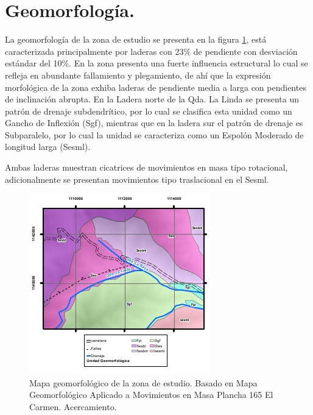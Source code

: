 \section{Geomorfolog\'{i}a.}
La geomorfolog\'{i}a de la zona de estudio se presenta en la figura \ref{fig:mapageomorfo}, est\'{a} caracterizada principalmente por laderas con 23\% de pendiente con desviaci\'{o}n est\'{a}ndar del 10\%.
En la zona presenta una fuerte influencia estructural lo cual se refleja en abundante fallamiento y plegamiento, de ah\'i que la expresi\'{o}n morfol\'{o}gica de la zona exhiba laderas de pendiente media a larga con pendientes de inclinaci\'{o}n abrupta. En la Ladera norte de la Qda. La Linda se presenta un patr\'{o}n de drenaje subdendr\'{i}tico, por lo cual se clasifica esta unidad como un Gancho de Inflexi\'{o}n (Sgf), mientras que en la ladera sur el patr\'{o}n de drenaje es Subparalelo, por lo cual la unidad se caracteriza como un Espol\'{o}n Moderado de longitud larga (Sesml). \cite{urrao}\par
Ambas laderas muestran cicatrices de movimientos en masa tipo rotacional, adicionalmente se presentan movimientos tipo traslacional en el Sesml. 
 \par


\begin{figure}[H]
\centering

\includegraphics[width=.8\textwidth]{img/geomorfo.pdf}
\caption{Mapa geomorfol\'{o}gico de la zona de estudio. Basado en Mapa Geomorfol\'{o}gico Aplicado a Movimientos en Masa Plancha 165 El Carmen. Acercamiento.}

\label{fig:mapageomorfo}
\end{figure}